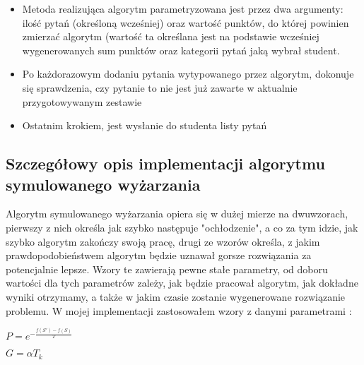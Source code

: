 \documentclass[a4paper, titlepage]{article}
\begin{document}
\begin{itemize}
\begin{itemize}
	\begin{itemize}
	\item Metoda realizująca algorytm parametryzowana jest przez dwa argumenty: ilość pytań (określoną wcześniej) oraz wartość punktów, do której powinien zmierzać algorytm (wartość ta określana jest na podstawie wcześniej wygenerowanych sum punktów oraz kategorii pytań jaką wybrał student.
			\item Po każdorazowym dodaniu pytania wytypowanego przez algorytm, dokonuje się sprawdzenia, czy pytanie to nie jest już zawarte w aktualnie przygotowywanym zestawie
			\item Ostatnim krokiem, jest wysłanie do studenta listy pytań
			\end{itemize}
			\end{itemize}
            
			\subsection{Szczegółowy opis implementacji algorytmu symulowanego wyżarzania}
            Algorytm symulowanego wyżarzania opiera się w dużej mierze na dwuwzorach, pierwszy z nich określa jak szybko następuje "ochłodzenie", a co za tym idzie, jak szybko algorytm zakończy swoją pracę, drugi ze wzorów określa, z jakim prawdopodobieństwem algorytm będzie uznawał gorsze rozwiązania za potencjalnie lepsze. Wzory te zawierają pewne stałe parametry, od doboru wartości dla tych parametrów zależy, jak będzie pracował algorytm, jak dokładne wyniki otrzymamy, a także w jakim czasie zostanie wygenerowane rozwiązanie problemu. W mojej implementacji zastosowałem wzory z danymi parametrami :

            \begin{center}
            
            { $P = e^{- \frac{f(S') - f(S)}{T}}$ }
            
            { $G = \alpha T_{k}$ }
            
			\end{center}            


\end{itemize}
\end{document}

